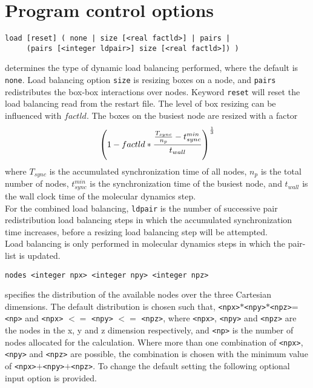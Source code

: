 \section{Program control options}
\begin{description}
\item
\begin{verbatim}
load [reset] ( none | size [<real factld>] | pairs |
     (pairs [<integer ldpair>] size [<real factld>]) )
\end{verbatim}
determines the type of dynamic load balancing performed,
where the default is {\tt none}. Load balancing option {\tt size}
is resizing boxes on a node, and {\tt pairs} redistributes the
box-box interactions over nodes. Keyword \verb+reset+ will reset the
load balancing read from the restart file. The level of box resizing
can be influenced with $factld$. The boxes on the busiest node are
resized with a factor
\begin{equation}
\left( 1 - factld * { {T_{sync} \over n_p} - t^{min}_{sync} \over t_{wall}}
\right)^{1\over 3}
\end{equation}
where $T_{sync}$ is the accumulated synchronization time of all nodes,
$n_p$ is the total number of nodes, $t^{min}_{sync}$ is the synchronization
time of the busiest node, and $t_{wall}$ is the wall clock time of the
molecular dynamics step.\\
For the combined load balancing, \verb+ldpair+ is the number of successive pair 
redistribution load balancing steps in which the accumulated synchronization
time increases, before a resizing load balancing step will be attempted.\\
Load balancing is only performed in molecular dynamics steps in which the
pair-list is updated.

\item
\begin{verbatim}
nodes <integer npx> <integer npy> <integer npz>
\end{verbatim}
specifies the distribution of the available nodes over the three 
Cartesian dimensions. The default distribution is chosen such that, 
\verb+<npx>+$*$\verb+<npy>+$*$\verb+<npz>+=\verb+<np>+
and \verb+<npx>+ $<=$ \verb+<npy>+ $<=$ \verb+<npz>+, 
where \verb+<npx>+, \verb+<npy>+ and \verb+<npz>+ are the nodes in the
x, y and z dimension respectively, and \verb+<np>+ is the number of nodes
allocated for the calculation. Where more than one combination
of \verb+<npx>+, \verb+<npy>+ and \verb+<npz>+ are possible, the 
combination is chosen with the minimum value of 
\verb+<npx>+$+$\verb+<npy>+$+$\verb+<npz>+. To change the default setting
the following optional input option is provided.


\end{description}

